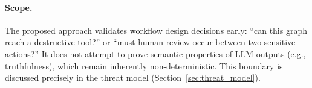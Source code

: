 \paragraph{Scope.}
The proposed approach validates workflow design decisions early: ``can this
graph reach a destructive tool?'' or ``must human review occur between
two sensitive actions?'' It does not attempt to prove semantic
properties of LLM outputs (e.g., truthfulness), which remain
inherently non-deterministic. This boundary is discussed precisely in
the threat model (Section~\ref{sec:threat_model}).
